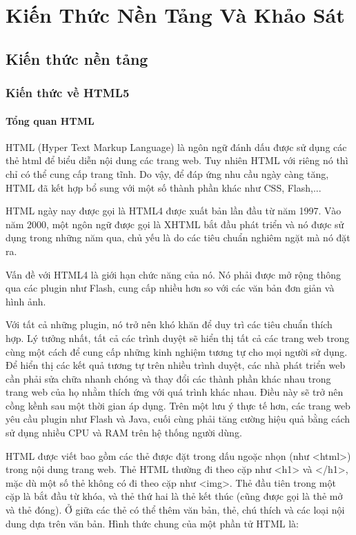 \chapter{Kiến Thức Nền Tảng Và Khảo Sát}
\ifpdf
    \graphicspath{{Chapter2/Chapter2Figs/PNG/}{Chapter2/Chapter2Figs/PDF/}{Chapter2/Chapter2Figs/}}
\else
    \graphicspath{{Chapter2/Chapter2Figs/EPS/}{Chapter2/Chapter2Figs/}}
\fi
\section{Kiến thức nền tảng}
\subsection{Kiến thức về HTML5}
\subsubsection{Tổng quan HTML}
HTML (Hyper Text Markup Language) là ngôn ngữ đánh dấu được sử dụng các thẻ html để biểu diễn nội dung các trang web. Tuy nhiên HTML với riêng nó thì chỉ có thể cung cấp trang tĩnh. Do vậy, để đáp ứng nhu cầu ngày càng tăng, HTML đã kết hợp bổ sung với một số thành phần khác như CSS, Flash,...

HTML ngày nay được gọi là HTML4 được xuất bản lần đầu từ năm 1997. Vào năm 2000, một ngôn ngữ được gọi là XHTML bắt đầu phát triển và nó được sử dụng trong những năm qua, chủ yếu là do các tiêu chuẩn nghiêm ngặt mà nó đặt ra.

Vấn đề với HTML4 là giới hạn chức năng của nó. Nó phải được mở rộng thông qua các plugin như Flash, cung cấp nhiều hơn so với các văn bản đơn giản và hình ảnh.

Với tất cả những plugin, nó trở nên khó khăn để duy trì các tiêu chuẩn thích hợp. Lý tưởng nhất, tất cả các trình duyệt sẽ hiển thị tất cả các trang web trong cùng một cách để cung cấp những kinh nghiệm tương tự cho mọi người sử dụng. Để hiển thị các kết quả tương tự trên nhiều trình duyệt, các nhà phát triển web cần phải sửa chữa nhanh chóng và thay đổi các thành phần khác nhau trong trang web của họ nhằm thích ứng với quá trình khác nhau. Điều này sẽ trở nên cồng kềnh sau một thời gian áp dụng. Trên một lưu ý thực tế hơn, các trang web yêu cầu plugin như Flash và Java, cuối cùng phải tăng cường hiệu quả bằng cách sử dụng nhiều CPU và RAM trên hệ thống người dùng.

HTML được viết bao gồm các thẻ được đặt trong dấu ngoặc nhọn (như <html>) trong nội dung trang web. Thẻ HTML thường đi theo cặp như <h1> và </h1>, mặc dù một số thẻ không có đi theo cặp như <img>. Thẻ đầu tiên trong một cặp là bắt đầu từ khóa, và thẻ thứ hai là thẻ kết thúc (cũng được gọi là thẻ mở và thẻ đóng). Ở giữa các thẻ có thể thêm văn bản, thẻ, chú thích và các loại nội dung dựa trên văn bản.
Hình thức chung của một phần tử HTML là:

